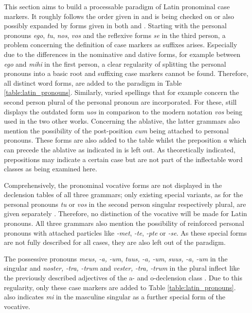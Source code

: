 \documentclass[11pt,a4paper,twoside,openright]{scrbook}
\begin{document}
This section aims to build a processable paradigm of Latin pronominal case markers. It roughly follows the order given in \citet{touratier2013lat} and is being checked on or also possibly expanded by forms given in both \citet{rubenbauer1995lat} and \citet{panhuis2015lat}. Starting with the personal pronouns \textit{ego}, \textit{tu}, \textit{nos}, \textit{vos} and the reflexive forms \textit{se} in the third person, a problem concerning the definition of case markers as suffixes arises. Especially due to the differences in the nominative and dative forms, for example between \textit{ego} and \textit{mihi} in the first person, a clear regularity of splitting the personal pronouns into a basic root and suffixing case markers cannot be found. Therefore, all distinct word forms, are added to the paradigm in Table \ref{table:latin_pronouns}. Similarly, varied spellings that for example concern the second person plural of the personal pronoun are incorporated. For these, \citet{touratier2013lat} still displays the outdated form \textit{uos} in comparison to the modern notation \textit{vos} being used in the two other works. Concerning the ablative, the latter grammars also mention the possibility of the post-position \textit{cum} being attached to personal pronouns. These forms are also added to the table whilst the preposition \textit{a} which can precede the ablative as indicated in \citet{rubenbauer1995lat} is left out. As theoretically indicated, prepositions may indicate a certain case but are not part of the inflectable word classes as being examined here. 

Comprehensively, the pronominal vocative forms are not displayed in the declension tables of all three grammars; only  existing special variants, as for the personal pronouns \textit{tu} or \textit{vos} in the second person singular respectively plural, are given separately \citep{panhuis2015lat}. Therefore, no distinction of the vocative will be made for Latin pronouns. All three grammars also mention the possibility of reinforced personal pronouns with attached particles like \textit{-met}, \textit{-te}, \textit{-pte} or \textit{-se}. As these special forms are not fully described for all cases, they are also left out of the paradigm.

The possessive pronouns \textit{meus, -a, -um}, \textit{tuus, -a, -um}, \textit{suus, -a, -um} in the singular and  \textit{noster, -tra, -trum} and \textit{vester, -tra, -trum} in the plural inflect like the previously described adjectives of the a- and o-declension class \citep{rubenbauer1995lat}. Due to this regularity, only these case markers are added to Table \ref{table:latin_pronouns}. \citet{rubenbauer1995lat} also indicates \textit{mi} in the masculine singular as a further special form of the vocative. 
\end{document}
